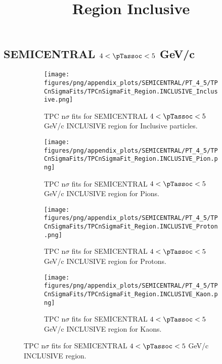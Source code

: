     
            \subsection*{SEMICENTRAL $4 < \pTassoc < 5$ GeV/c}
            \begin{figure}[H]
                \title{Region Inclusive}
                \begin{subfigure}[b]{0.5\textwidth}
                    \centering
                    \texttt{[image: figures/png/appendix\_plots/SEMICENTRAL/PT\_4\_5/TPCnSigmaFits/TPCnSigmaFit\_Region.INCLUSIVE\_Inclusive.png]}
                    \caption{TPC n$\sigma$ fits for SEMICENTRAL $4 < \pTassoc < 5$ GeV/c INCLUSIVE region for Inclusive particles.}
                    \label{fig:appendix_SEMICENTRAL_$4 < \pTassoc < 5$ GeV/c_INCLUSIVE_Inclusive}
                \end{subfigure}
                \begin{subfigure}[b]{0.5\textwidth}
                    \centering
                    \texttt{[image: figures/png/appendix\_plots/SEMICENTRAL/PT\_4\_5/TPCnSigmaFits/TPCnSigmaFit\_Region.INCLUSIVE\_Pion.png]}
                    \caption{TPC n$\sigma$ fits for SEMICENTRAL $4 < \pTassoc < 5$ GeV/c INCLUSIVE region for Pions.}
                    \label{fig:appendix_SEMICENTRAL_$4 < \pTassoc < 5$ GeV/c_INCLUSIVE_Pion}
                \end{subfigure}
                \begin{subfigure}[b]{0.5\textwidth}
                    \centering
                    \texttt{[image: figures/png/appendix\_plots/SEMICENTRAL/PT\_4\_5/TPCnSigmaFits/TPCnSigmaFit\_Region.INCLUSIVE\_Proton.png]}
                    \caption{TPC n$\sigma$ fits for SEMICENTRAL $4 < \pTassoc < 5$ GeV/c INCLUSIVE region for Protons.}
                    \label{fig:appendix_SEMICENTRAL_$4 < \pTassoc < 5$ GeV/c_INCLUSIVE_Proton}
                \end{subfigure}
                \begin{subfigure}[b]{0.5\textwidth}
                    \centering
                    \texttt{[image: figures/png/appendix\_plots/SEMICENTRAL/PT\_4\_5/TPCnSigmaFits/TPCnSigmaFit\_Region.INCLUSIVE\_Kaon.png]}
                    \caption{TPC n$\sigma$ fits for SEMICENTRAL $4 < \pTassoc < 5$ GeV/c INCLUSIVE region for Kaons.}
                    \label{fig:appendix_SEMICENTRAL_$4 < \pTassoc < 5$ GeV/c_INCLUSIVE_Kaon}
                \end{subfigure}
                \caption{TPC n$\sigma$ fits for SEMICENTRAL $4 < \pTassoc < 5$ GeV/c INCLUSIVE region.}
                \label{fig:appendix_SEMICENTRAL_$4 < \pTassoc < 5$ GeV/c_INCLUSIVE}
            \end{figure}
